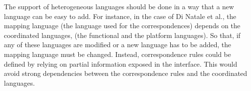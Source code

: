 The support of heterogeneous languages should be done in a way that a new language can be easy to add. For instance, in the case of Di Natale et al., the mapping language (\ie the language used for the correspondences) depends on the coordinated languages, (\ie the functional and the platform languages). So that, if any of these languages are modified or a new language has to be added, the mapping language must be changed. Instead, correspondence rules could be defined by relying on partial information exposed in the interface. This would avoid strong dependencies between the correspondence rules and the coordinated languages.






